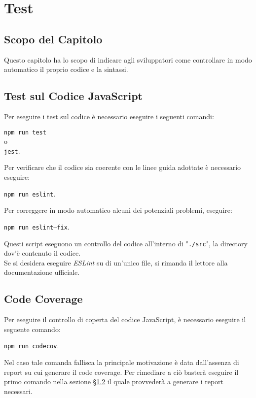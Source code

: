 \section{Test}\label{Test}

\subsection{Scopo del Capitolo}\label{Test_scopo}
Questo capitolo ha lo scopo di indicare agli sviluppatori come controllare in modo automatico il proprio codice e la sintassi.

\subsection{Test sul Codice JavaScript}\label{test_JS}
Per eseguire i test sul codice è necessario eseguire i seguenti comandi:
\begin{center}
	\texttt{npm run test}\\
	o\\
	\texttt{jest}.
\end{center}
Per verificare che il codice sia coerente con le linee guida adottate è necessario eseguire:
\begin{center}
	\texttt{npm run eslint}.
\end{center}
Per correggere in modo automatico alcuni dei potenziali problemi, eseguire:
\begin{center}
	\texttt{npm run eslint--fix}.
\end{center}
Questi script eseguono un controllo del codice all'interno di "\texttt{./src}", la directory dov'è contenuto il codice.\\
Se si desidera eseguire \textit{ESLint} su di un'unico file, si rimanda il lettore alla documentazione ufficiale.

\subsection{Code Coverage}\label{test_codecoverage}
Per eseguire il controllo di coperta del codice JavaScript, è necessario eseguire il seguente comando:
\begin{center}
	\texttt{npm run codecov}.
\end{center}
Nel caso tale comanda fallisca la principale motivazione è data dall'assenza di report su cui generare il code coverage. Per rimediare a ciò basterà eseguire il primo comando nella sezione §\ref{test_JS} il quale provvederà a generare i report necessari.
